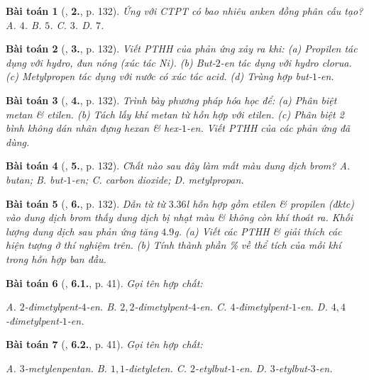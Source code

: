 \documentclass{article}
\numberwithin{equation}{section}
\newtheorem{baitoan}{Bài toán}[section]
\begin{document}
\begin{baitoan}[\cite{SGK_Hoa_Hoc_11_co_ban}, \textbf{2.}, p. 132]
	Ứng với CTPT \emph{} có bao nhiêu anken đồng phân cấu tạo? {\sf A.} $4$. {\sf B.} $5$. {\sf C.} $3$. {\sf D.} $7$.
\end{baitoan}

\begin{baitoan}[\cite{SGK_Hoa_Hoc_11_co_ban}, \textbf{3.}, p. 132]
	Viết PTHH của phản ứng xảy ra khi: (a) Propilen tác dụng với hydro, đun nóng (xúc tác \emph{Ni}). (b) But-$2$-en tác dụng với hydro clorua. (c) Metylpropen tác dụng với nước có xúc tác acid. (d) Trùng hợp but-$1$-en.
\end{baitoan}

\begin{baitoan}[\cite{SGK_Hoa_Hoc_11_co_ban}, \textbf{4.}, p. 132]
	Trình bày phương pháp hóa học để: (a) Phân biệt metan \& etilen. (b) Tách lấy khí metan từ hỗn hợp với etilen. (c) Phân biệt 2 bình không dán nhãn đựng hexan \& hex-$1$-en. Viết PTHH của các phản ứng đã dùng.
\end{baitoan}

\begin{baitoan}[\cite{SGK_Hoa_Hoc_11_co_ban}, \textbf{5.}, p. 132]
	Chất nào sau đây làm mất màu dung dịch brom? {\sf A.} butan; {\sf B.} but-$1$-en; {\sf C.} carbon dioxide; {\sf D.} metylpropan.
\end{baitoan}

\begin{baitoan}[\cite{SGK_Hoa_Hoc_11_co_ban}, \textbf{6.}, p. 132]
	Dẫn từ từ $3.36$\emph{l} hỗn hợp gồm etilen \& propilen (đktc) vào dung dịch brom thấy dung dịch bị nhạt màu \& không còn khí thoát ra. Khối lượng dung dịch sau phản ứng tăng $4.9$\emph{g}. (a) Viết các PTHH \& giải thích các hiện tượng ở thí nghiệm trên. (b) Tính thành phần \% về thể tích của mỗi khí trong hỗn hợp ban đầu.
\end{baitoan}

\begin{baitoan}[\cite{SBT_Hoa_Hoc_11_co_ban}, \textbf{6.1.}, p. 41]
	Gọi tên hợp chất:
	\begin{center}
	\end{center}
	{\sf A.} $2$-đimetylpent-$4$-en. {\sf B.} $2,2$-đimetylpent-$4$-en. {\sf C.} $4$-đimetylpent-$1$-en. {\sf D.} $4,4$-đimetylpent-$1$-en.
\end{baitoan}

\begin{baitoan}[\cite{SBT_Hoa_Hoc_11_co_ban}, \textbf{6.2.}, p. 41]
	Gọi tên hợp chất:
	\begin{center}
	\end{center}
	{\sf A.} $3$-metylenpentan. {\sf B.} $1,1$-đietyleten. {\sf C.} $2$-etylbut-$1$-en. {\sf D.} $3$-etylbut-$3$-en.
\end{baitoan}
\end{document}
